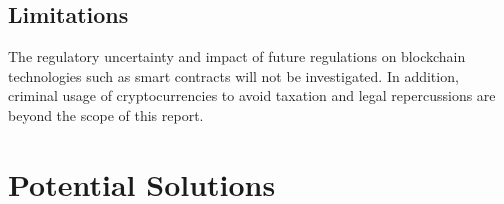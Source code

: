 \documentclass[12pt]{scrartcl}
\begin{document}
\subsection{Limitations}

The regulatory uncertainty and impact of future regulations on blockchain technologies such as smart contracts will not be investigated. In addition, criminal usage of cryptocurrencies to avoid taxation and legal repercussions are beyond the scope of this report. 

\newpage  
\section{Potential Solutions}
\end{document}
